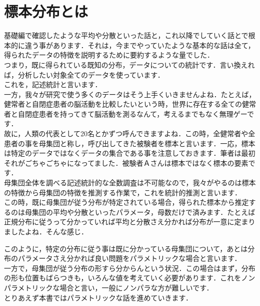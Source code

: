 \documentclass[11pt,a4paper,uplatex]{ujreport} 	%
\begin{document}
\section{標本分布とは}

基礎編で確認したような平均や分散といった話と，これ以降でしていく話とで根本的に違う事があります．それは，今までやっていたような基本的な話は全て，得られたデータの特徴を説明するために要約するような量でした．\\

つまり，既に得られている既知の分布，データについての統計です．言い換えれば，分析したい対象全てのデータを使っています．\\

これを，記述統計と言います．\\

一方，我々が研究で使う多くのデータはそう上手くいきませんよね．たとえば，健常者と自閉症患者の脳活動を比較したいという時，世界に存在する全ての健常者と自閉症患者を持ってきて脳活動を測るなんて，考えるまでもなく無理ゲーです．\\

故に，人類の代表として20名とかずつ呼んできますよね．この時，全健常者や全患者の事を母集団と称し，呼び出してきた被験者を標本と言います．一応，標本は特定のデータではなくデータの集合である事を注意しておきます．筆者は最初それがごちゃごちゃになってました．被験者Ａさんは標本ではなく標本の要素です．\\

母集団全体を調べる記述統計的な全数調査は不可能なので，我々がやるのは標本の特徴から母集団の特徴を推測する作業で，これを統計的推測と言います．\\

この時，既に母集団が従う分布が特定されている場合，得られた標本から推定するのは母集団の平均や分散といったパラメータ，母数だけで済みます．たとえば正規分布に従うって分かっていれば平均と分散さえ分かれば分布が一意に定まりましたよね．そんな感じ．

このように，特定の分布に従う事は既に分かっている母集団について，あとは分布のパラメータさえ分かれば良い問題をパラメトリックな場合と言います．\\

一方で，母集団が従う分布の形すら分からんという状況．この場合はまず，分布の形も位置もばらつきも，いろんな値を考えていく必要があります．これをノンパラメトリックな場合と言い，一般にノンパラな方が難しいです．\\

とりあえず本書ではパラメトリックな話を進めていきます．\\
\end{document}
